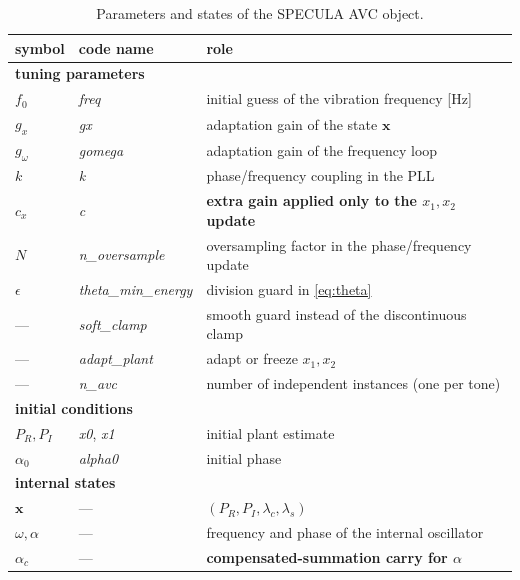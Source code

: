 \documentclass[11pt]{article}
\newcommand{\vx}{\mathbf{x}}
\begin{document}
\begin{table}
\centering\small
\begin{tabular}{llp{8.4cm}}
\toprule
symbol & code name & role\\
\midrule
\multicolumn{3}{l}{\textbf{tuning parameters}}\\
$f_0$        & \textit{freq}    & initial guess of the vibration frequency [Hz]\\
$g_x$        & \textit{gx}      & adaptation gain of the state $\vx$\\
$g_\omega$   & \textit{gomega}  & adaptation gain of the frequency loop\\
$k$          & \textit{k}       & phase/frequency coupling in the PLL\\
$c_x$        & \textit{c}       & \textbf{extra gain applied only to the $x_1,x_2$ update}\\
$N$          & \textit{n\_oversample} & oversampling factor in the phase/frequency update\\
$\epsilon$   & \textit{theta\_min\_energy} & division guard in \eqref{eq:theta}\\
---          & \textit{soft\_clamp}   & smooth guard instead of the discontinuous clamp\\
---          & \textit{adapt\_plant}  & adapt or freeze $x_1,x_2$\\
---          & \textit{n\_avc}   & number of independent instances (one per tone)\\
\midrule
\multicolumn{3}{l}{\textbf{initial conditions}}\\
$P_R,P_I$    & \textit{x0}, \textit{x1} & initial plant estimate\\
$\alpha_0$   & \textit{alpha0}  & initial phase\\
\midrule
\multicolumn{3}{l}{\textbf{internal states}}\\
$\vx$        & ---              & $(P_R,P_I,\lambda_c,\lambda_s)$\\
$\omega,\alpha$ & ---           & frequency and phase of the internal oscillator\\
$\alpha_c$   & ---              & \textbf{compensated-summation carry for $\alpha$}\\
\bottomrule
\end{tabular}
\caption{Parameters and states of the SPECULA AVC object.}
\label{tab:avcpar}
\end{table}
\end{document}
